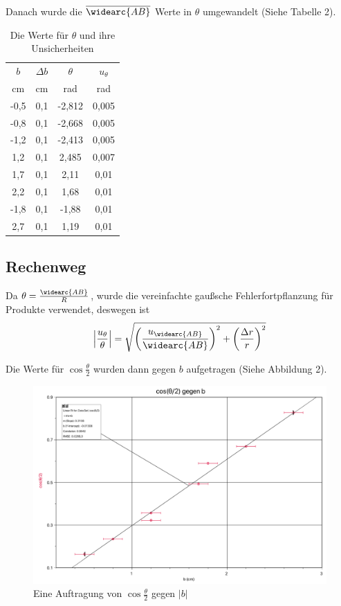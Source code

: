 \documentclass[11pt,a4paper]{article}
\begin{document}
Danach wurde die $\overline{\widearc{AB}}$ Werte in $\theta$ umgewandelt (Siehe Tabelle 2).

\begin{table}[h]
	\centering
	\begin{tabular*}{0.50\textwidth}{@{\extracolsep{\fill}}cccc}
		\toprule
		$b$ & $\Delta b$ & $\theta$ & $u_\theta$  \\
		cm & cm & rad & rad \\
		\midrule
		-0,5 & 0,1 & -2,812 & 0,005\\
		-0,8 & 0,1  &-2,668& 0,005\\
		-1,2 & 0,1  &-2,413& 0,005\\
		1,2 & 0,1 &2,485& 0,007\\
		1,7 & 0,1  &2,11& 0,01\\
		2,2 & 0,1  &1,68& 0,01\\
		-1,8 & 0,1  &-1,88& 0,01\\
		2,7 & 0,1  &1,19& 0,01\\
		\bottomrule
	\end{tabular*}
\caption{Die Werte für $\theta$ und ihre Unsicherheiten}
\end{table}

\begin{tcolorbox}[colback=white]
\subsection{Rechenweg}
Da $\theta = \frac{\widearc{AB}}{R}$, wurde die vereinfachte gaußsche Fehlerfortpflanzung für Produkte verwendet, deswegen ist
$$ \left|\frac{u_\theta}{\theta}\right| = \sqrt{\left(\frac{u_{\widearc{AB}}}{\widearc{AB}}\right)^2+\left(\frac{\Delta r}{r}\right)^2}$$
\end{tcolorbox}

Die Werte für $\cos{\frac{\theta}{2}}$ wurden dann gegen $b$ aufgetragen (Siehe Abbildung 2). 
\begin{figure}[h]
	\centering
	\includegraphics[width=\linewidth]{Abb2}
	\caption{Eine Auftragung von $\cos{\frac{\theta}{2}}$ gegen $|b|$}
\end{figure}
\end{document}

